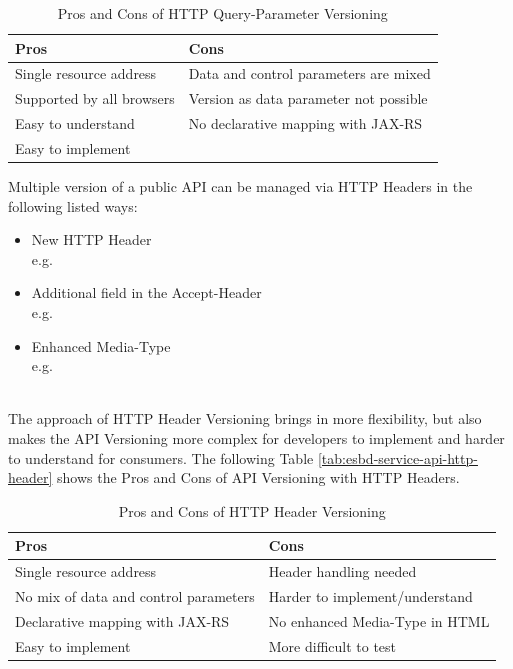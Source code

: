 {\renewcommand{\arraystretch}{1.2}%
	\begin{table}[h]
		\begin{tabularx}{\textwidth}{ X|X }	
			\textbf{Pros}                 & \textbf{Cons}    \\  \hline
			Single resource address       & Data and control parameters are mixed     \\  
			Supported by all browsers     & Version as data parameter not possible     \\
			Easy to understand            & No declarative mapping with JAX-RS     \\
			Easy to implement             & \\ \hline
		\end{tabularx}
		\caption{Pros and Cons of HTTP Query-Parameter Versioning}
		\label{tab:esbd-service-api-query-param}
\end{table}}

Multiple version of a public API can be managed via HTTP Headers in the following listed ways:
\begin{itemize}
	\item New HTTP Header \\
	e.g. 
	\item Additional field in the Accept-Header \\
	e.g. 
	\item Enhanced Media-Type \\
	e.g. 
\end{itemize}
\ \\
The approach of HTTP Header Versioning brings in more flexibility, but also makes the API Versioning more complex for developers to implement and harder to understand for consumers. The following Table \vref{tab:esbd-service-api-http-header} shows the Pros and Cons of API Versioning with HTTP Headers.

{\renewcommand{\arraystretch}{1.2}%
	\begin{table}[h]
		\begin{tabularx}{\textwidth}{ X|X }	
			\textbf{Pros}                         & \textbf{Cons}    \\  \hline
			Single resource address               & Header handling needed     \\  
			No mix of data and control parameters & Harder to implement/understand     \\
			Declarative mapping with JAX-RS       & No enhanced Media-Type in HTML     \\
			Easy to implement                     & More difficult to test \\ \hline
		\end{tabularx}
		\caption{Pros and Cons of HTTP Header Versioning}
		\label{tab:esbd-service-api-http-header}
\end{table}}

